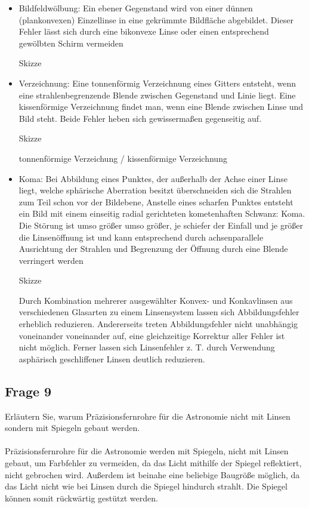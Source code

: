 \documentclass[a4paper,10pt]{scrartcl}
\begin{document}
		\begin{itemize}
			\item Bildfeldwölbung: Ein ebener Gegenstand wird von einer dünnen (plankonvexen) Einzellinse in eine gekrümmte Bildfläche abgebildet. Dieser Fehler lässt sich durch eine bikonvexe Linse oder einen entsprechend gewölbten Schirm vermeiden
		
				\begin{center}
				Skizze
				\end{center}
		
			\item Verzeichnung: Eine tonnenförmig Verzeichnung eines Gitters entsteht, wenn eine strahlenbegrenzende Blende zwischen Gegenstand und Linie liegt. Eine kissenförmige Verzeichnung findet man, wenn eine Blende zwischen Linse und Bild steht. Beide Fehler heben sich gewissermaßen gegenseitig auf.
		
				\begin{center}
				Skizze
				\end{center}

				tonnenförmige Verzeichung / kissenförmige Verzeichnung
			
			\item Koma: Bei Abbildung eines Punktes, der außerhalb der Achse einer Linse liegt, welche sphärische Aberration besitzt überschneiden sich die Strahlen zum Teil schon vor der Bildebene, Anstelle eines scharfen Punktes entsteht ein Bild mit einem einseitig radial gerichteten kometenhaften Schwanz: Koma. Die Störung ist umso größer umso größer, je schiefer der Einfall und je größer die Linsenöffnung ist und kann entsprechend durch achsenparallele Ausrichtung der Strahlen und Begrenzung der Öffnung durch eine Blende verringert werden
			
				\begin{center}
				Skizze
				\end{center}
	
			Durch Kombination mehrerer ausgewählter Konvex- und Konkavlinsen aus verschiedenen Glasarten zu einem Linsensystem lassen sich Abbildungsfehler erheblich reduzieren. Andererseits treten Abbildungsfehler nicht unabhängig voneinander voneinander auf, eine gleichzeitige Korrektur aller Fehler ist nicht möglich. Ferner lassen sich Linsenfehler z. T. durch Verwendung asphärisch geschliffener Linsen deutlich reduzieren.
		\end{itemize}	
	\subsection{Frage 9}
		Erläutern Sie, warum Präzisionsfernrohre für die Astronomie nicht mit Linsen sondern mit Spiegeln gebaut werden.
		\\
		\\
		Präzisionsfernrohre für die Astronomie werden mit Spiegeln, nicht mit Linsen gebaut, um Farbfehler zu vermeiden, da das Licht mithilfe der Spiegel reflektiert, nicht gebrochen wird. Außerdem ist beinahe eine beliebige Baugröße möglich, da das Licht nicht wie bei Linsen durch die Spiegel hindurch strahlt. Die Spiegel können somit rückwärtig gestützt werden.
\end{document}
